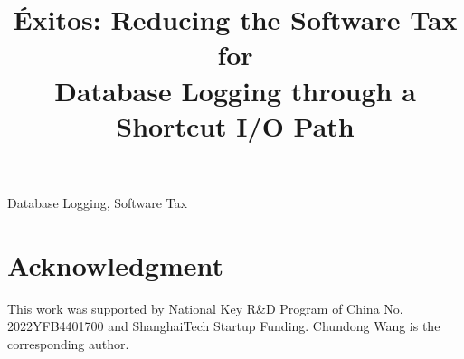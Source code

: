 \documentclass[conference]{IEEEtran}
\newcommand{\odes}{\'Exitos\xspace}
\begin{document}
\title{\odes: Reducing the Software Tax for\\ Database Logging through a Shortcut I/O Path}

\author{

}

\maketitle
 



\begin{IEEEkeywords}
	Database Logging, Software Tax
\end{IEEEkeywords}

 






\section*{Acknowledgment}

This work was supported by National Key R\&D Program of China No. 2022YFB4401700 and 
ShanghaiTech Startup Funding. Chundong Wang is the corresponding author.



\end{document}
